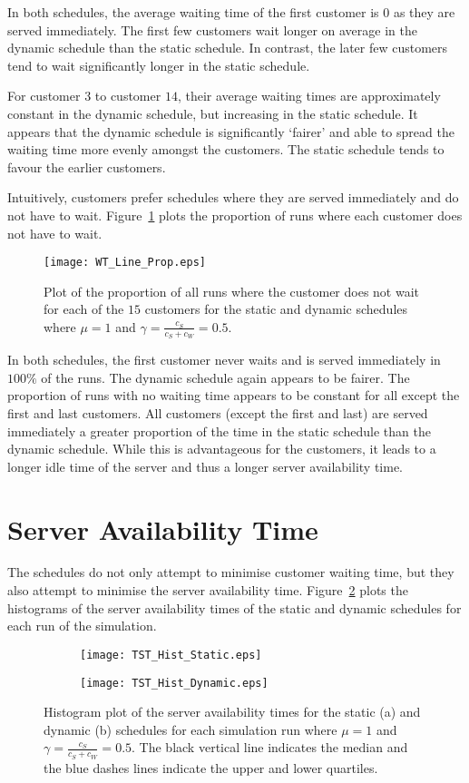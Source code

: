 In both schedules, the average waiting time of the first customer is $0$ as they are served immediately. The first few customers wait longer on average in the dynamic schedule than the static schedule. In contrast, the later few customers tend to wait significantly longer in the static schedule.

For customer $3$ to customer $14$, their average waiting times are approximately constant in the dynamic schedule, but increasing in the static schedule. It appears that the dynamic schedule is significantly `fairer' and able to spread the waiting time more evenly amongst the customers. The static schedule tends to favour the earlier customers.

Intuitively, customers prefer schedules where they are served immediately and do not have to wait. Figure~\ref{fig:No_Wait_Position} plots the proportion of runs where each customer does not have to wait.
\begin{figure}[htb]
	\centering
	\texttt{[image: WT\_Line\_Prop.eps]}
	\caption{Plot of the proportion of all runs where the customer does not wait for each of the $15$ customers for the static and dynamic schedules where $\mu = 1$ and $\gamma = \frac{c_{S}}{c_{S} + c_{W}} = 0.5$.}
	\label{fig:No_Wait_Position}
\end{figure}

In both schedules, the first customer never waits and is served immediately in $100 \%$ of the runs. The dynamic schedule again appears to be fairer. The proportion of runs with no waiting time appears to be constant for all except the first and last customers. All customers (except the first and last) are served immediately a greater proportion of the time in the static schedule than the dynamic schedule. While this is advantageous for the customers, it leads to a longer idle time of the server and thus a longer server availability time.

\section{Server Availability Time}
The schedules do not only attempt to minimise customer waiting time, but they also attempt to minimise the server availability time. Figure~\ref{fig:Two_Server} plots the histograms of the server availability times of the static and dynamic schedules for each run of the simulation.
\begin{figure}[htb]
	\centering
	\begin{subfigure}[t]{0.45\textwidth}
		\centering
		\texttt{[image: TST\_Hist\_Static.eps]}
		\caption{}
	\end{subfigure}
	\begin{subfigure}[t]{0.45\textwidth}
		\centering
		\texttt{[image: TST\_Hist\_Dynamic.eps]}
		\caption{}
	\end{subfigure}
	\caption{Histogram plot of the server availability times for the static (a) and dynamic (b) schedules for each simulation run where $\mu = 1$ and $\gamma = \frac{c_{S}}{c_{S} + c_{W}} = 0.5$. The black vertical line indicates the median and the blue dashes lines indicate the upper and lower quartiles.}
	\label{fig:Two_Server}
\end{figure}

